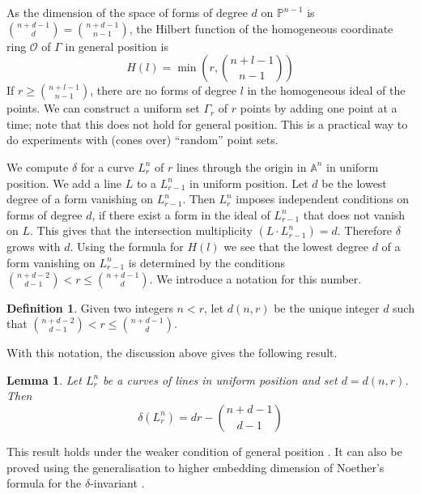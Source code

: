 \documentclass{amsart}
\renewcommand{\P}{\mathbb{P}}
\newcommand{\A}{\mathbb{A}}
\renewcommand{\ell}{l}
\newcommand{\mO}{\mathcal{O}}
\newtheorem{lemma}[thm]{Lemma}
\theoremstyle{definition}
\newtheorem{defn}[thm]{Definition}
\theoremstyle{remark}
\begin{document}
 
As the dimension of the space of forms of degree $d$ on $\P^{n-1}$ is $\binom{n+d-1}d=
\binom{n+d-1}{n-1}$, the Hilbert function of the homogeneous coordinate
ring $\mO$ of $\Gamma$ in general position is
\[
H(\ell) = \min\left(r,\binom{n+\ell-1}{n-1}\right)
\]
If $r\geq\binom{n+\ell-1}{n-1}$, there are no forms of degree $\ell$
in the homogeneous ideal of the points. 
We can construct a uniform set $\Gamma_r $ of $r$ points by adding one point at a time; note 
that this does not hold for general position. This is a practical way to do experiments with (cones over)
``random'' point sets.


We compute $\delta$ for a curve $L_r^n$ of $r$ lines through the origin in $\A^n$
in uniform position. We add a line  $L$ to a  $L_{r-1}^n$ in uniform position. 
Let $d$ be the lowest degree of a form vanishing on $L_{r-1}^n$. Then $L_{r}^n$
imposes independent conditions on forms of degree $d$, if there exist a form in the ideal of
$L_{r-1}^n$ that does not vanish on $L$. This gives that the intersection 
multiplicity $(L\cdot L_{r-1}^n)=d$. Therefore $\delta$ grows with $d$.
Using the formula for $H(\ell)$ we see that the lowest degree $d$ 
of a form vanishing on $L_{r-1}^n$ is determined by 
the conditions $\binom{n+d-2}{d-1} <r \leq \binom{n+d-1}{d}$. We introduce
a notation for this number.

\begin{defn}\label{defn:dnr}
Given two integers $n<r$, let $d(n,r)$ be the unique integer $d$ such
that $\binom{n+d-2}{d-1} <r \leq \binom{n+d-1}{d}$.
\end{defn}

With this notation,  the discussion above gives the following result.

\begin{lemma}\label{lem:delta}
Let  $L_r^n$ be a curves of lines in uniform position and set $d=d(n,r)$. Then
\[
\delta(L_r^n) = dr-\binom{n+d-1}{d-1}
\]
\end{lemma}

This result holds under the weaker condition of general position \cite[Lemma 3.3]{Gr}.
It can also be proved
using  the generalisation to higher embedding dimension of Noether's formula for the 
$\delta$-invariant \cite{St3}.
\end{document}

